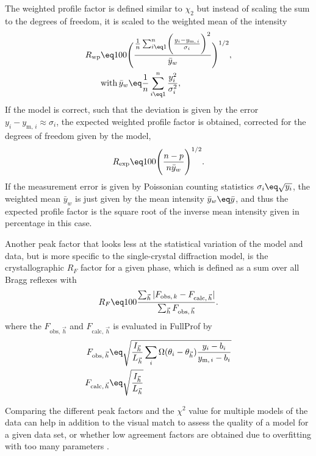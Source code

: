 \documentclass[\main/dresen_thesis.tex]{subfiles}
\begin{document}
    The weighted profile factor is defined similar to $\chi_2$ but instead of scaling the sum to the degrees of freedom, it is scaled to the weighted mean of the intensity
    \begin{align}
      \begin{split}
        R_{\mathrm{wp}}
        &\eq 100 \Biggl(
          \frac{\frac{1}{n} \sum_{i \eq 1}^n \biggl(\frac{y_i - y_{\mathrm{m},\,i}}{\sigma_i}\biggr)^2}
               {\bar{y}_w}
          \Biggr)^{1/2},\\
        &\mathrm{with\,} \bar{y}_w \eq \frac{1}{n} \sum_{i\eq1}^n \frac{y_i^2}{\sigma_i^2},
      \end{split}
    \end{align}
    If the model is correct, such that the deviation is given by the error $y_i - y_{\mathrm{m},\,i} \approx \sigma_i$, the expected weighted profile factor is obtained, corrected for the degrees of freedom given by the model,
    \begin{align}
      R_{\mathrm{exp}} \eq 100 \Biggl( \frac{n-p}{ n \bar{y}_w } \Biggr)^{1/2}.
    \end{align}
    If the measurement error is given by Poissonian counting statistics $\sigma_i \eq \sqrt{y_i}$, the weighted mean $\bar{y}_w$ is just given by the mean intensity $\bar{y}_w \eq \bar{y}$, and thus the expected profile factor is the square root of the inverse mean intensity given in percentage in this case.

    Another peak factor that looks less at the statistical variation of the model and data, but is more specific to the single-crystal diffraction model, is the crystallographic $R_F$ factor for a given phase, which is defined as a sum over all Bragg reflexes with
    \begin{align}
      R_F \eq 100
        \frac{\sum_{\vec{h}} |F_{\mathrm{obs},\, k} - F_{\mathrm{calc},\,\vec{h}}|}
             {\sum_{\vec{h}} F_{\mathrm{obs},\, \vec{h}}}.
    \end{align}
    where the $F_{\mathrm{obs},\, \vec{h}}$ and $F_{\mathrm{calc},\,\vec{h}}$ is evaluated in FullProf by
    \begin{align}
      F_{ \mathrm{obs}, \, \vec{h} } &\eq
      \sqrt{ \frac{I_{\vec{h}}}{L_{\vec{h}}} \sum_{i} \Omega(\theta_i - \theta_{\vec{h}}) \frac{y_{i} - b_i}{y_{\mathrm{m},\,i} - b_i} } \\
      F_{\mathrm{calc},\,\vec{h}} &\eq \sqrt{\frac{I_{\vec{h}}}{L_{\vec{h}}}}
    \end{align}

    Comparing the different peak factors and the $\chi^2$ value for multiple models of the data can help in addition to the visual match to assess the quality of a model for a given data set, or \ie whether low agreement factors are obtained due to overfitting with too many parameters \cite{Toby_2006_Rfact}.
\end{document}
